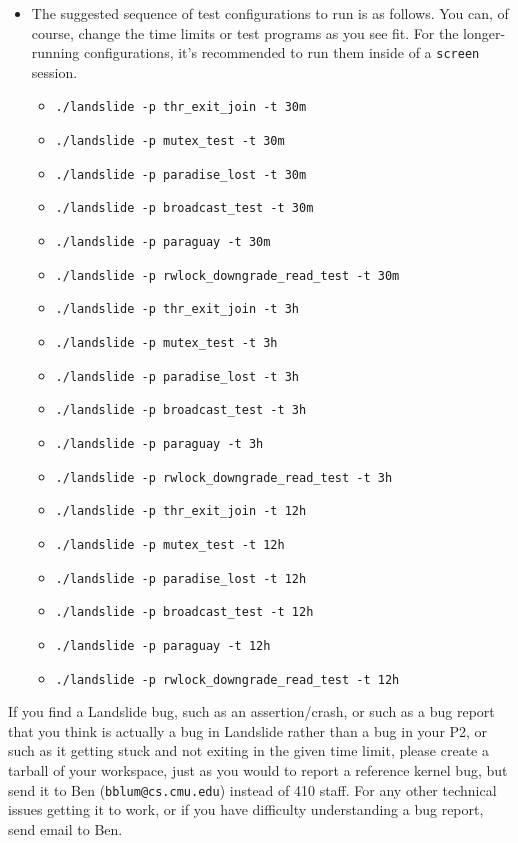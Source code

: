 \documentclass{article}
\begin{document}
\begin{enumerate}
\begin{itemize}
			\item The suggested sequence of test configurations to run is as follows. You can, of course, change the time limits or test programs as you see fit. For the longer-running configurations, it's recommended to run them inside of a {\tt screen} session.
			\begin{itemize}
				\item {\tt ./landslide -p thr\_exit\_join -t 30m}
				\item {\tt ./landslide -p mutex\_test -t 30m}
				\item {\tt ./landslide -p paradise\_lost -t 30m}
				\item {\tt ./landslide -p broadcast\_test -t 30m}
				\item {\tt ./landslide -p paraguay -t 30m}
				\item {\tt ./landslide -p rwlock\_downgrade\_read\_test -t 30m} \\
				\item {\tt ./landslide -p thr\_exit\_join -t 3h}
				\item {\tt ./landslide -p mutex\_test -t 3h}
				\item {\tt ./landslide -p paradise\_lost -t 3h}
				\item {\tt ./landslide -p broadcast\_test -t 3h}
				\item {\tt ./landslide -p paraguay -t 3h}
				\item {\tt ./landslide -p rwlock\_downgrade\_read\_test -t 3h} \\
				\item {\tt ./landslide -p thr\_exit\_join -t 12h}
				\item {\tt ./landslide -p mutex\_test -t 12h}
				\item {\tt ./landslide -p paradise\_lost -t 12h}
				\item {\tt ./landslide -p broadcast\_test -t 12h}
				\item {\tt ./landslide -p paraguay -t 12h}
				\item {\tt ./landslide -p rwlock\_downgrade\_read\_test -t 12h}
			\end{itemize}
		\end{itemize}
\end{enumerate}

If you find a Landslide bug, such as an assertion/crash, or such as a bug report that you think is actually a bug in Landslide rather than a bug in your P2, or such as it getting stuck and not exiting in the given time limit, please create a tarball of your workspace, just as you would to report a reference kernel bug, but send it to Ben (\texttt{bblum@cs.cmu.edu}) instead of 410 staff.
For any other technical issues getting it to work, or if you have difficulty understanding a bug report, send email to Ben.
\\
\end{document}
